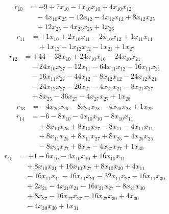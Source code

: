\[\begin{aligned}
r_{10} &= - 9 + 7 x_{10} - 1 x_{10} x_{10} + 4 x_{10} x_{12} \\
 &\quad - 4 x_{10} x_{25} - 12 x_{12} - 4 x_{12} x_{12} + 8 x_{12} x_{25} \\
 &\quad + 12 x_{25} - 4 x_{25} x_{25} + 1 x_{26}
\end{aligned}\]
\[\begin{aligned}
r_{11} &= + 1 x_{10} + 2 x_{10} x_{11} - 2 x_{10} x_{12} + 1 x_{11} x_{11} \\
 &\quad + 1 x_{12} - 1 x_{12} x_{12} - 1 x_{21} + 1 x_{27}
\end{aligned}\]
\[\begin{aligned}
r_{12} &= + 44 - 38 x_{10} + 24 x_{10} x_{10} - 24 x_{10} x_{21} \\
 &\quad - 24 x_{10} x_{27} - 12 x_{11} - 64 x_{11} x_{12} - 16 x_{11} x_{21} \\
 &\quad - 16 x_{11} x_{27} - 44 x_{12} - 8 x_{12} x_{12} - 24 x_{12} x_{21} \\
 &\quad - 24 x_{12} x_{27} - 26 x_{21} - 4 x_{21} x_{21} - 8 x_{21} x_{27} \\
 &\quad + 8 x_{25} - 36 x_{27} - 4 x_{27} x_{27} + 1 x_{28}
\end{aligned}\]
\[\begin{aligned}
r_{13} &= - 4 x_{26} x_{26} - 8 x_{26} x_{28} - 4 x_{28} x_{28} + 1 x_{29}
\end{aligned}\]
\[\begin{aligned}
r_{14} &= - 6 - 8 x_{10} - 4 x_{10} x_{10} - 8 x_{10} x_{11} \\
 &\quad + 8 x_{10} x_{25} + 8 x_{10} x_{27} - 8 x_{11} - 4 x_{11} x_{11} \\
 &\quad + 8 x_{11} x_{25} + 8 x_{11} x_{27} + 8 x_{25} - 4 x_{25} x_{25} \\
 &\quad - 8 x_{25} x_{27} + 8 x_{27} - 4 x_{27} x_{27} + 1 x_{30}
\end{aligned}\]
\[\begin{aligned}
r_{15} &= + 1 - 6 x_{10} - 4 x_{10} x_{10} + 16 x_{10} x_{11} \\
 &\quad + 8 x_{10} x_{21} + 16 x_{10} x_{27} + 8 x_{10} x_{30} + 4 x_{11} \\
 &\quad - 16 x_{11} x_{11} - 16 x_{11} x_{21} - 32 x_{11} x_{27} - 16 x_{11} x_{30} \\
 &\quad + 2 x_{21} - 4 x_{21} x_{21} - 16 x_{21} x_{27} - 8 x_{21} x_{30} \\
 &\quad + 8 x_{27} - 16 x_{27} x_{27} - 16 x_{27} x_{30} + 4 x_{30} \\
 &\quad - 4 x_{30} x_{30} + 1 x_{31}
\end{aligned}\]
